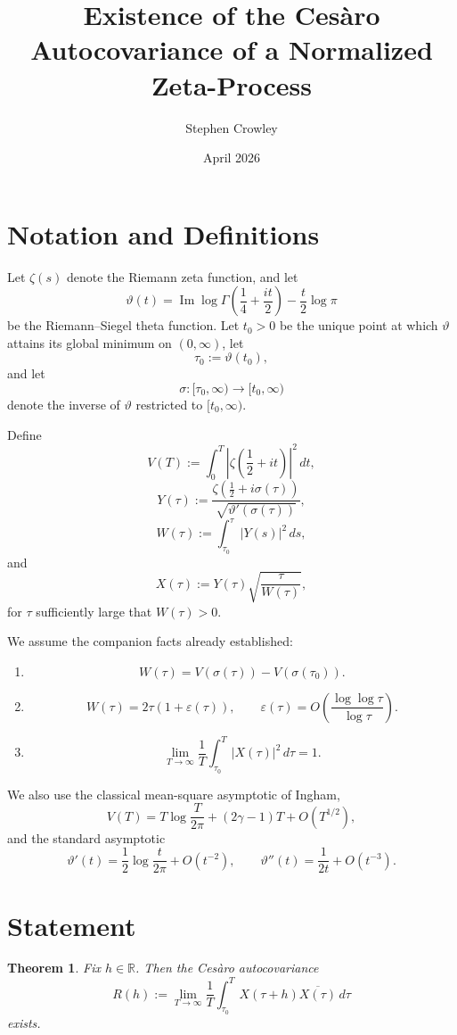 \documentclass[11pt]{article}
\title{Existence of the Ces\`aro Autocovariance of a Normalized Zeta-Process}
\author{Stephen Crowley}
\date{April 2026}
\theoremstyle{plain}
\newtheorem{theorem}{Theorem}
\theoremstyle{definition}
\newcommand{\assign}{:=}
\begin{document}
\maketitle

\section{Notation and Definitions}

Let $\zeta(s)$ denote the Riemann zeta function, and let
\[
\vartheta(t)
=
\operatorname{Im}\log \Gamma\!\left(\frac14+\frac{it}{2}\right)-\frac{t}{2}\log\pi
\]
be the Riemann--Siegel theta function. Let $t_0>0$ be the unique point at which
$\vartheta$ attains its global minimum on $(0,\infty)$, let
\[
\tau_0 \assign \vartheta(t_0),
\]
and let
\[
\sigma:[\tau_0,\infty)\to [t_0,\infty)
\]
denote the inverse of $\vartheta$ restricted to $[t_0,\infty)$.

Define
\[
V(T)\assign \int_0^T \left|\zeta\!\left(\frac12+it\right)\right|^2\,dt,
\]
\[
Y(\tau)\assign \frac{\zeta\!\left(\frac12+i\sigma(\tau)\right)}
{\sqrt{\vartheta'(\sigma(\tau))}},
\]
\[
W(\tau)\assign \int_{\tau_0}^{\tau}|Y(s)|^2\,ds,
\]
and
\[
X(\tau)\assign Y(\tau)\sqrt{\frac{\tau}{W(\tau)}},
\]
for $\tau$ sufficiently large that $W(\tau)>0$.

We assume the companion facts already established:

\begin{enumerate}
\item[(F1)]
\[
W(\tau)=V(\sigma(\tau))-V(\sigma(\tau_0)).
\]

\item[(F2)]
\[
W(\tau)=2\tau(1+\varepsilon(\tau)),
\qquad
\varepsilon(\tau)=O\!\left(\frac{\log\log\tau}{\log\tau}\right).
\]

\item[(F3)]
\[
\lim_{T\to\infty}\frac1T\int_{\tau_0}^T |X(\tau)|^2\,d\tau = 1.
\]
\end{enumerate}

We also use the classical mean-square asymptotic of Ingham,
\[
V(T)=T\log\frac{T}{2\pi}+(2\gamma-1)T+O(T^{1/2}),
\]
and the standard asymptotic
\[
\vartheta'(t)=\frac12\log\frac{t}{2\pi}+O(t^{-2}),
\qquad
\vartheta''(t)=\frac{1}{2t}+O(t^{-3}).
\]

\section{Statement}

\begin{theorem}
\label{thm:main}
Fix $h\in\mathbb{R}$. Then the Ces\`aro autocovariance
\[
R(h)\assign \lim_{T\to\infty}\frac1T\int_{\tau_0}^T X(\tau+h)\overline{X(\tau)}\,d\tau
\]
exists.
\end{theorem}
\end{document}
